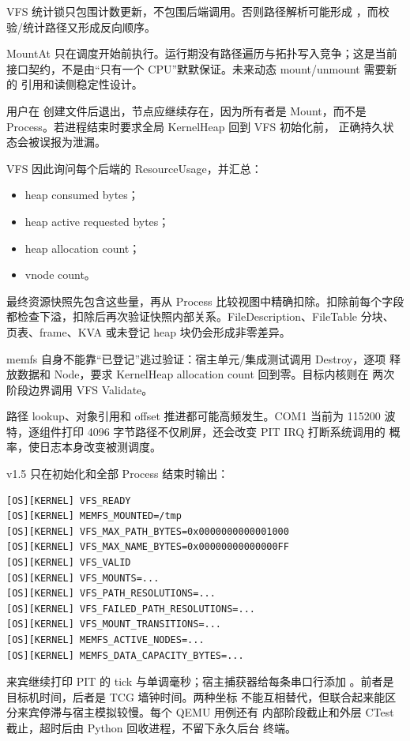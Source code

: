 VFS 统计锁只包围计数更新，不包围后端调用。否则路径解析可能形成
，而校验/统计路径又形成反向顺序。

MountAt 只在调度开始前执行。运行期没有路径遍历与拓扑写入竞争；这是当前
接口契约，不是由“只有一个 CPU”默默保证。未来动态 mount/unmount 需要新的
引用和读侧稳定性设计。

用户在  创建文件后退出，节点应继续存在，因为所有者是
Mount，而不是 Process。若进程结束时要求全局 KernelHeap 回到 VFS 初始化前，
正确持久状态会被误报为泄漏。

VFS 因此询问每个后端的 ResourceUsage，并汇总：

\begin{itemize}
  \item heap consumed bytes；
  \item heap active requested bytes；
  \item heap allocation count；
  \item vnode count。
\end{itemize}

最终资源快照先包含这些量，再从 Process 比较视图中精确扣除。扣除前每个字段
都检查下溢，扣除后再次验证快照内部关系。FileDescription、FileTable 分块、
页表、frame、KVA 或未登记 heap 块仍会形成非零差异。

memfs 自身不能靠“已登记”逃过验证：宿主单元/集成测试调用 Destroy，逐项
释放数据和 Node，要求 KernelHeap allocation count 回到零。目标内核则在
两次阶段边界调用 VFS Validate。

路径 lookup、对象引用和 offset 推进都可能高频发生。COM1 当前为 115200
波特，逐组件打印 4096 字节路径不仅刷屏，还会改变 PIT IRQ 打断系统调用的
概率，使日志本身改变被测调度。

v1.5 只在初始化和全部 Process 结束时输出：

\begin{lstlisting}[caption={VFS 的有界阶段日志}]
[OS][KERNEL] VFS_READY
[OS][KERNEL] MEMFS_MOUNTED=/tmp
[OS][KERNEL] VFS_MAX_PATH_BYTES=0x0000000000001000
[OS][KERNEL] VFS_MAX_NAME_BYTES=0x00000000000000FF
[OS][KERNEL] VFS_VALID
[OS][KERNEL] VFS_MOUNTS=...
[OS][KERNEL] VFS_PATH_RESOLUTIONS=...
[OS][KERNEL] VFS_FAILED_PATH_RESOLUTIONS=...
[OS][KERNEL] VFS_MOUNT_TRANSITIONS=...
[OS][KERNEL] MEMFS_ACTIVE_NODES=...
[OS][KERNEL] MEMFS_DATA_CAPACITY_BYTES=...
\end{lstlisting}

来宾继续打印 PIT 的 tick 与单调毫秒；宿主捕获器给每条串口行添加
\code{[QEMU][T+...ms]}。前者是目标机时间，后者是 TCG 墙钟时间。两种坐标
不能互相替代，但联合起来能区分来宾停滞与宿主模拟较慢。每个 QEMU 用例还有
内部阶段截止和外层 CTest 截止，超时后由 Python 回收进程，不留下永久后台
终端。

